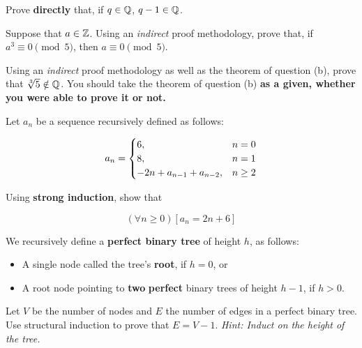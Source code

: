 \documentclass[letterpaper,12pt]{article}
\begin{document}
\notespage



{\large Prove {\bf directly} that, if $q \in \mathbb{Q}$, $q-1 \in \mathbb{Q}$. }

\answerspacefullpage


{\large Suppose that $a \in \mathbb{Z}$. Using an {\em indirect} proof methodology, prove that, if $a^3 \equiv 0 \pmod{5}$, then $a \equiv 0 \pmod{5}$. }  

\answerspacefullpage


{\large Using an {\em indirect} proof methodology as well as the theorem of question (b), prove that $\sqrt[3]{5} \notin \mathbb{Q}$. You should take the theorem of question (b) {\bf as a given, whether you were able to prove it or not.} }

\answerspacefullpage

\notespage



{\large Let $a_n$ be a sequence recursively defined as follows: }


{\Large $$a_n = \begin{cases}6, & n = 0 \\ 8, & n = 1 \\ -2n + a_{\tiny n-1} + a_{\tiny n-2}, & n \geq 2 \end{cases}$$ }

{\large Using {\bf strong induction}, show that }

{\Large $$(\forall n\ge 0)[a_n = 2n+6]$$ }

\vspace{-.2in}
\standardinductionspace

\pagebreak


{\large We recursively define a {\bf perfect binary tree} of height $h$, as follows:

\begin{itemize}
	\item A single node called the tree's \textbf{root}, if $h=0$, or 
	\item A root node pointing to \textbf{two} \textbf{perfect} binary trees of height $h-1$, if $h>0$.
\end{itemize}


Let $V$ be the number of nodes and $E$ the number of edges in a perfect binary tree.  Use structural induction to prove that $E=V - 1$.  \textit{Hint: Induct on the height of the tree.}

} 
\standardinductionspace
\end{document}
